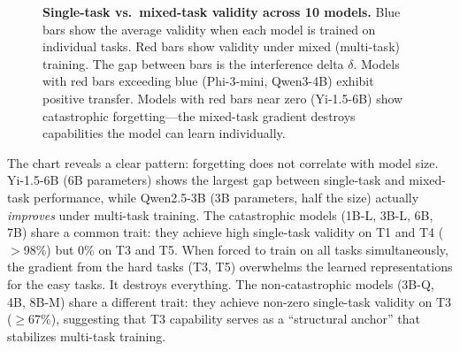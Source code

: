 \documentclass[11pt]{article}
\begin{document}
\begin{figure}[t]
\centering
{}
\caption{\textbf{Single-task vs.\ mixed-task validity across 10 models.} Blue bars show the average validity when each model is trained on individual tasks.  Red bars show validity under mixed (multi-task) training.  The gap between bars is the interference delta $\delta$.  Models with red bars exceeding blue (Phi-3-mini, Qwen3-4B) exhibit positive transfer.  Models with red bars near zero (Yi-1.5-6B) show catastrophic forgetting---the mixed-task gradient destroys capabilities the model can learn individually.}
\label{fig:forgetting-heatmap}
\end{figure}

The chart reveals a clear pattern: forgetting does not correlate with model size.  Yi-1.5-6B (6B parameters) shows the largest gap between single-task and mixed-task performance, while Qwen2.5-3B (3B parameters, half the size) actually \emph{improves} under multi-task training.  The catastrophic models (1B-L, 3B-L, 6B, 7B) share a common trait: they achieve high single-task validity on T1 and T4 ($>$98\%) but 0\% on T3 and T5.  When forced to train on all tasks simultaneously, the gradient from the hard tasks (T3, T5) overwhelms the learned representations for the easy tasks.  It destroys everything.  The non-catastrophic models (3B-Q, 4B, 8B-M) share a different trait: they achieve non-zero single-task validity on T3 ($\geq$67\%), suggesting that T3 capability serves as a ``structural anchor'' that stabilizes multi-task training.
\end{document}
